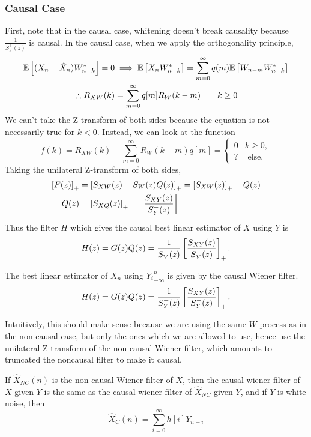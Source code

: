 \subsubsection{Causal Case}
First, note that in the causal case, whitening doesn't break causality because $\frac{1}{S_Y^+(z)}$ is causal.
In the causal case, when we apply the orthogonality principle,
\begin{align*}
	\mathbb{E}\left[(X_n-\hat{X}_n)W_{n-k}^*\right] = 0 &\implies \mathbb{E}\left[X_nW^*_{n-k}\right] = \sum_{m=0}^\infty q(m)\mathbb{E}\left[W_{n-m}W^*_{n-k}\right]\\
	\therefore R_{XW}(k) &= \sum_{m = 0}^\infty q[m]R_W(k-m) \qquad k \geq 0
\end{align*}
We can't take the Z-transform of both sides because the equation is not necessarily true for $k < 0$.
Instead, we can look at the function \[
	f(k) = R_{XW}(k) - \sum_{m=0}^\infty R_W(k-m)q[m] = \begin{cases} 0 & k\geq 0,\\ ? & \text{ else.}\end{cases}
\]
Taking the unilateral Z-transform of both sides,
\begin{align*}
	\left[F(z)\right]_+ &= \left[S_{XW}(z) - S_W(z)Q(z)\right]_+ = \left[S_{XW}(z)\right]_+ - Q(z)\\
	Q(z) &= \left[S_{XQ}(z)\right]_+ = \left[\frac{S_{XY}(z)}{S_Y^-(z)}\right]_+
\end{align*}
Thus the filter $H$ which gives the causal best linear estimator of $X$ using $Y$ is \[
	H(z) = G(z)Q(z) = \frac{1}{S_Y^+(z)}\left[\frac{S_{XY}(z)}{S_Y^-(z)}\right]_+.
\]
\begin{definition}
	The best linear estimator of $X_n$ using ${Y_i}_{-\infty}^{n}$ is given by the causal Wiener filter. \[
		H(z) = G(z)Q(z) = \frac{1}{S_Y^+(z)}\left[\frac{S_{XY}(z)}{S_Y^-(z)}\right]_+.
	\]
	\label{defn:causal-wiener}
\end{definition}
Intuitively, this should make sense because we are using the same $W$ process as in the non-causal case, but only the ones which we are allowed to use, hence use the unilateral Z-transform of the non-causal Wiener filter, which amounts to truncated the noncausal filter to make it causal.
\begin{theorem}
	If $\hat{X}_{NC}(n)$ is the non-causal Wiener filter of $X$, then the causal wiener filter of $X$ given $Y$ is the same as the causal wiener filter of $\hat{X}_{NC}$ given $Y$, and if $Y$ is white noise, then \[
		\hat{X}_C(n) = \sum_{i=0}^{\infty}h[i]Y_{n-i}
	\]
	\label{thm:causal-wiener}
\end{theorem}
